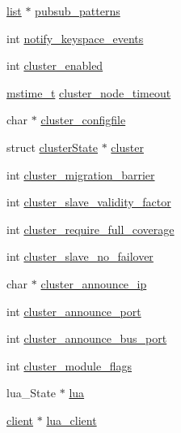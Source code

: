\begin{DoxyCompactItemize}
\item 
\hyperlink{structlist}{list} $\ast$ \hyperlink{structredis_server_aced844471ea20e757a4bc7bdee34d930}{pubsub\+\_\+patterns}
\item 
int \hyperlink{structredis_server_aa886fb87091fa910b444f9d00d792b18}{notify\+\_\+keyspace\+\_\+events}
\item 
int \hyperlink{structredis_server_a6ed7e8eb73b7d9072d719f525ea51063}{cluster\+\_\+enabled}
\item 
\hyperlink{redismodule_8h_a652ae61e2475bc8957454534544968fc}{mstime\+\_\+t} \hyperlink{structredis_server_a096ccc623839d9ec2ce7b80cf9d1b4a2}{cluster\+\_\+node\+\_\+timeout}
\item 
char $\ast$ \hyperlink{structredis_server_a073361fbb3cafb1304ba30260585b408}{cluster\+\_\+configfile}
\item 
struct \hyperlink{structcluster_state}{cluster\+State} $\ast$ \hyperlink{structredis_server_a99f21f2f011d0994a31c20057fe79a72}{cluster}
\item 
int \hyperlink{structredis_server_a4a08cd2c8856e15a14b0ebcff7305a6e}{cluster\+\_\+migration\+\_\+barrier}
\item 
int \hyperlink{structredis_server_ae410e7aa29b3cb4a15ab178f573e6fa2}{cluster\+\_\+slave\+\_\+validity\+\_\+factor}
\item 
int \hyperlink{structredis_server_a75c9adc095d3d8e9670249063267c1e4}{cluster\+\_\+require\+\_\+full\+\_\+coverage}
\item 
int \hyperlink{structredis_server_a20f2120dbdc24446be7f4a2950a7ad9e}{cluster\+\_\+slave\+\_\+no\+\_\+failover}
\item 
char $\ast$ \hyperlink{structredis_server_a8273ca89328d272782c8aed13b137526}{cluster\+\_\+announce\+\_\+ip}
\item 
int \hyperlink{structredis_server_a8128d183929124046c3411691de82b0a}{cluster\+\_\+announce\+\_\+port}
\item 
int \hyperlink{structredis_server_a6b891047e7daea5f7d603218e0249b7e}{cluster\+\_\+announce\+\_\+bus\+\_\+port}
\item 
int \hyperlink{structredis_server_a55d43de23d27c946ee397eb185bd8e98}{cluster\+\_\+module\+\_\+flags}
\item 
lua\+\_\+\+State $\ast$ \hyperlink{structredis_server_ab44819023af4734d6f559d7f4e3d18bb}{lua}
\item 
\hyperlink{structclient}{client} $\ast$ \hyperlink{structredis_server_a407493a25d3985e05f34c9ccf0413c3b}{lua\+\_\+client}
\item 

\end{DoxyCompactItemize}
